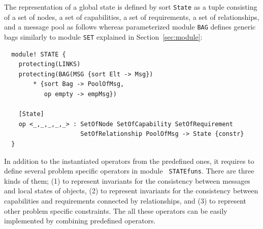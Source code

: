 \documentclass[12pt]{report}
\begin{document}
The representation of a global state is defined by sort {\tt State} as
a tuple consisting of a set of nodes, a set of capabilities, a set of
requirements, a set of relationships, and a message pool as follows
whereas parameterized module {\tt BAG} defines generic bags similarly
to module {\tt SET} explained in Section~\ref{sec:module}:
\small
\begin{verbatim}
  module! STATE {
    protecting(LINKS)
    protecting(BAG(MSG {sort Elt -> Msg})
        * {sort Bag -> PoolOfMsg,
           op empty -> empMsg})
  
    [State]
    op <_,_,_,_,_> : SetOfNode SetOfCapability SetOfRequirement 
                     SetOfRelationship PoolOfMsg -> State {constr}
  }
\end{verbatim}
\normalsize

In addition to the instantiated operators from the predefined ones, it
requires to define several problem specific operators in module {\tt
  STATEfuns}. There are three kinds of them; (1) to represent
invariants for the consistency between messages and local states of
objects, (2) to represent invariants for the consistency between
capabilities and requirements connected by relationships, and (3) to
represent other problem specific constraints. The all these operators can
be easily implemented by combining predefined operators.
\end{document}
